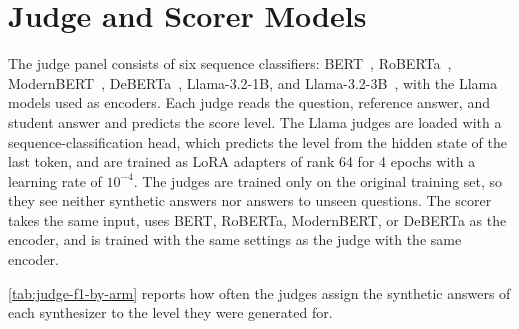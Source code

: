 \section{Judge and Scorer Models}
\label{app:judge-scorer}

The judge panel consists of six sequence classifiers: BERT~\citep{devlinBERTPretrainingDeep2019}, RoBERTa~\citep{liuRoBERTaRobustlyOptimized2019}, ModernBERT~\citep{warnerSmarterBetterFaster2025}, DeBERTa~\citep{heDeBERTaV3ImprovingDeBERTa2023}, Llama-3.2-1B, and Llama-3.2-3B~\citep{grattafioriLlama3Herd2024}, with the Llama models used as encoders. Each judge reads the question, reference answer, and student answer and predicts the score level. The Llama judges are loaded with a sequence-classification head, which predicts the level from the hidden state of the last token, and are trained as LoRA adapters of rank 64 for 4 epochs with a learning rate of $10^{-4}$. The judges are trained only on the original training set, so they see neither synthetic answers nor answers to unseen questions. The scorer takes the same input, uses BERT, RoBERTa, ModernBERT, or DeBERTa as the encoder, and is trained with the same settings as the judge with the same encoder.

\autoref{tab:judge-f1-by-arm} reports how often the judges assign the synthetic answers of each synthesizer to the level they were generated for.

\begin{table}[t]
\centering
\footnotesize
\setlength{\tabcolsep}{2pt}
%
\caption{F1 (\%) of the six judges on synthetic answers, against the level each was generated for. \textbf{Bold} marks the best per column.}
\label{tab:judge-f1-by-arm}
\end{table}


